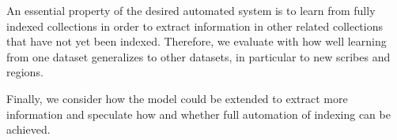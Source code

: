 



An essential property of the desired automated system is to learn from fully indexed collections in order to extract information in other related collections that have not yet been indexed.
Therefore, we evaluate with how well learning from one dataset generalizes to other datasets, in particular to new scribes and regions.

Finally, we consider how the model could be extended to extract more information and speculate how and whether full automation of indexing can be achieved.


